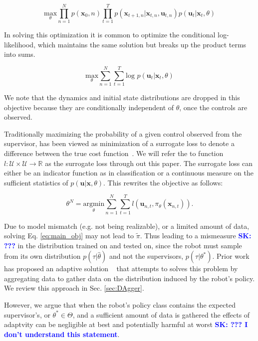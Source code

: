 \documentclass[10pt, conference]{ieeeconf}      %
\newcommand{\bu}{\mathbf{u}}
\newcommand{\bx}{\mathbf{x}}
\newcommand{\sknote}[1]{\ifthenelse{ \boolean{include-notes}}%
 {\textcolor{blue}{\textbf{SK: #1}}}{}}
\begin{document}
$$\underset{\theta}{\mbox{max}} \prod^N_{n=1} p(\bx_0,n) \prod^T_{t=1} p(\bx_{t+1,n}|\bx_{t,n},\bu_{t,n})p(\bu_t|\bx_t,\theta)$$

In solving this optimization it is common to optimize the conditional log-likelihood, which maintains the same solution but breaks up the product terms into sums. 

\begin{equation}\label{eq:m_likeli_obj}
\underset{\theta}{\mbox{max}} \sum^N_{n=1}\sum^T_{t=1}\mbox{log }p(\bu_t|\bx_t,\theta)
\end{equation}


We note that the dynamics and initial state distributions are dropped in this objective because they are conditionally independent of $\theta$, once the controls are observed. 

 Traditionally maximizing the probability of a given control observed from the supervisor, has been viewed as minimization of a surrogate loss to denote a difference between the true cost function~\cite{ross2010reduction,ross2010efficient}. We will refer the to function $l : \mathcal{U} \times \mathcal{U} \rightarrow \mathbb{R}$ as the surrogate loss through out this paper. The surrogate loss can either be an indicator function as in classification or a continuous measure on the sufficient statistics of $p(\bu|\bx,\theta)$.  This rewrites the objective as follows: 

\begin{equation}\label{eq:main_obj}
\theta^N = \underset{\theta}{\mbox{argmin}} \sum^N_{n=1}\sum^T_{t=1} l(\bu_{n,t}, \pi_{\theta} (\bx_{n,t})).
\end{equation}


Due to model mismatch (e.g. not being realizable), or a limited amount of data, solving Eq. \ref{eq:main_obj} may not lead to $\tilde{\pi}$.  Thus leading to a mismeasure \sknote{???} in the distribution trained on and tested on, since the robot must sample from its own distribution $p(\tau|\hat{\theta})$ and not the supervisors, $p(\tau|\theta^*)$.  Prior work has proposed an adaptive solution ~\cite{ross2010reduction} that attempts to solves this problem by aggregating data to gather data on the distribution induced by the robot's policy. We review this approach in Sec. \ref{sec:DAgger}. 

However, we argue that when the robot's policy class contains the expected supervisor's, or  $\theta^* \in  \Theta$, and a sufficient amount of data is gathered the effects of adaptvity can be negligible at best and potentially harmful at worst \sknote{??? I don't understand this statement}. 
\end{document}
